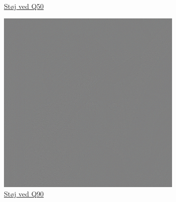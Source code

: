 \begin{figure}
\begin{minipage}[b]{0.31\linewidth}
\caption{\href{https://www.dropbox.com/home/P1\%20-\%20B205/vejleder/billeder/DCT/Fejlbilleder?preview=fejl50.png}{Støj ved Q50}}
\label{fig:noiseQ50}
\end{minipage}
\hspace{0.2cm}
\begin{minipage}[b]{0.31\linewidth}
\centering
\includegraphics[width=0.8\textwidth]{Billeder/fejlbilleder/fejl90.png}
\caption{\href{https://www.dropbox.com/home/P1\%20-\%20B205/vejleder/billeder/DCT/Fejlbilleder?preview=fejl90.png}{Støj ved Q90}}
\label{fig:noiseQ90}
\end{minipage}
\hspace{0.2cm}
\end{figure}
